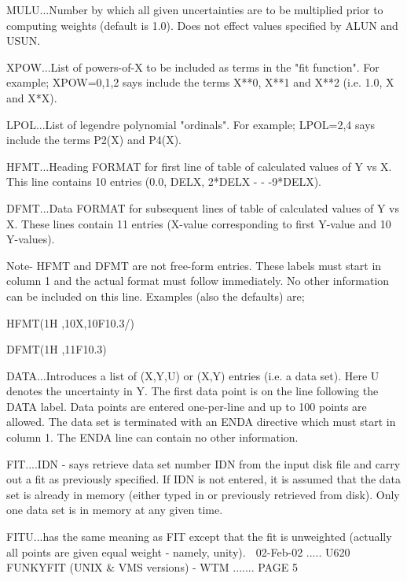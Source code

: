    MULU...Number by which all given uncertainties are to be  multiplied  prior
          to  computing  weights  (default  is  1.0).  Does  not effect values
          specified by ALUN and USUN.
 
   XPOW...List of powers-of-X to be included as terms in the  "fit  function".
          For  example;  XPOW=0,1,2 says include the terms X**0, X**1 and X**2
          (i.e. 1.0, X and X*X).
 
   LPOL...List of legendre polynomial "ordinals". For example;  LPOL=2,4  says
          include the terms P2(X) and P4(X).
 
   HFMT...Heading  FORMAT for first line of table of calculated values of Y vs
          X. This line contains 10 entries (0.0, DELX, 2*DELX - - -9*DELX).
 
   DFMT...Data FORMAT for subsequent lines of table of calculated values of  Y
          vs  X.  These  lines  contain  11  entries (X-value corresponding to
          first Y-value and 10 Y-values).
 
          Note- HFMT and DFMT are not free-form  entries.  These  labels  must
          start  in column 1 and the actual format must follow immediately. No
          other information can be included on this line. Examples  (also  the
          defaults) are;
 
   HFMT(1H ,10X,10F10.3/)
 
   DFMT(1H ,11F10.3)
 
   DATA...Introduces  a  list  of  (X,Y,U) or (X,Y) entries (i.e. a data set).
          Here U denotes the uncertainty in Y. The first data point is on  the
          line  following the DATA label. Data points are entered one-per-line
          and up to 100 points are allowed. The data set  is  terminated  with
          an  ENDA  directive  which must start in column 1. The ENDA line can
          contain no other information.
 
   FIT....IDN - says retrieve data set number IDN from  the  input  disk  file
          and  carry out a fit as previously specified. If IDN is not entered,
          it is assumed that the data set is already in memory  (either  typed
          in  or  previously  retrieved  from  disk).  Only one data set is in
          memory at any given time.
 
   FITU...has the same meaning as  FIT  except  that  the  fit  is  unweighted
          (actually all points are given equal weight - namely, unity).
    
   02-Feb-02 ..... U620  FUNKYFIT (UNIX & VMS versions) - WTM ....... PAGE   5
 
